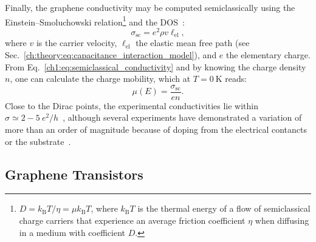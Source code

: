 Finally, the graphene conductivity may be computed semiclassically using the Einstein--Smoluchowski relation\footnote[2]{$D = k_\textrm{B}T/\eta = \mu k_\textrm{B}T$, where $k_\textrm{B}T$ is the thermal energy of a flow of semiclassical charge carriers that experience an average friction coefficient $\eta$ when diffusing in a medium with coefficient $D$.} and the \gls{DOS}~\cite{bolotin2008temperature}:
%
\begin{equation}\label{ch1:eq:semiclassical_conductivity}
    \sigma_{\textrm{sc}}=e^{2} \rho v \ell_{\mathrm{el}},
\end{equation}
%
where $v$ is the carrier velocity, $\ell_{\mathrm{el}}$ the elastic mean free path (see Sec.~\ref{ch:theory:eq:capacitance_interaction_model}), and $e$ the elementary charge. From Eq.~\ref{ch1:eq:semiclassical_conductivity} and by knowing the charge density $n$, one can calculate the charge mobility, which at $T=\SI{0 }{\kelvin}$ reads:
%
\begin{equation}
    \mu(E)=\frac{\sigma_\mathrm{sc}}{e n}.
\end{equation}
%
Close to the Dirac points, the experimental conductivities lie within $\sigma\simeq 2-5~e^{2}/ h$~\cite{chen2008charged}, although several experiments have demonstrated a variation of more than an order of magnitude because of doping from the electrical contancts or the substrate~\cite{jiang2007quantum, ozyilmaz2007electronic}.

\subsection{Graphene Transistors}

